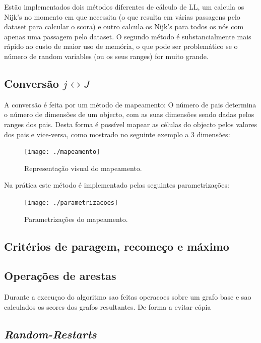 \documentclass[10pt]{article}
\numberwithin{equation}{section}
\begin{document}
Estão implementados dois métodos diferentes de cálculo de LL, um calcula os Nijk's no momento em que necessita (o que resulta em várias passagens pelo dataset para calcular o scora) e outro calcula os Nijk's para todos os nós com apenas uma passagem pelo dataset. O segundo método é substancialmente mais rápido ao custo de maior uso de memória, o que pode ser problemático se o número de random variables (ou os seus ranges) for muito grande.

\subsection{Conversão $j \leftrightarrow J$}
A conversão é feita por um método de mapeamento: 
O número de pais determina o número de dimensões de um objecto, com as suas dimensões sendo dadas pelos ranges dos pais. Desta forma é possível mapear as células do objecto pelos valores dos pais e vice-versa, como mostrado no seguinte exemplo a 3 dimensões:

\begin{figure}[H]
	\centering
	\texttt{[image: ./mapeamento]}
	\caption{Representação visual do mapeamento.}
	\vspace{-0.8em}
\end{figure}

Na prática este método é implementado pelas seguintes parametrizações:

\begin{figure}[H]
	\centering
	\texttt{[image: ./parametrizacoes]}
	\caption{Parametrizações do mapeamento.}
	\vspace{-0.8em}
\end{figure}

\subsection{Critérios de paragem, recomeço e máximo}


\subsection{Operações de arestas}




Durante a execuçao do algoritmo sao feitas operacoes sobre um grafo base e sao calculados os scores dos grafos resultantes. De forma a evitar cópia 

\subsection{\textit{Random-Restarts}}
\end{document}
